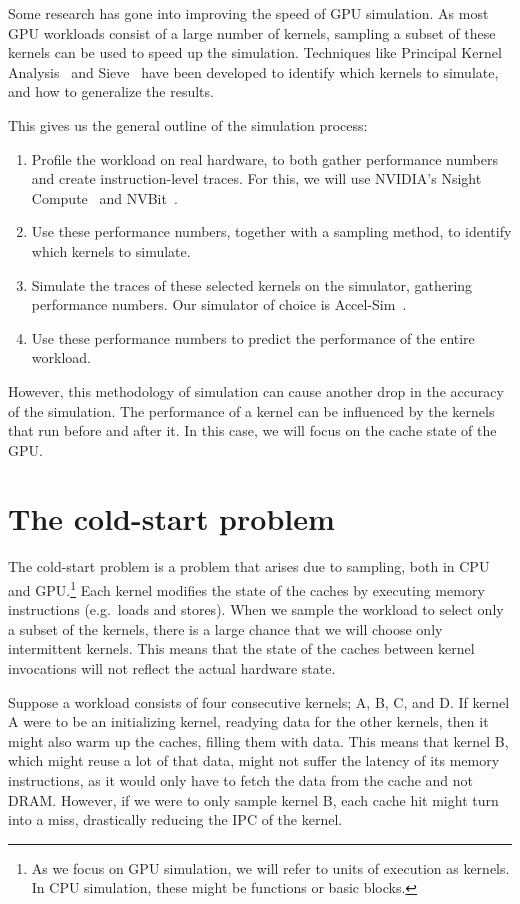 Some research has gone into improving the speed of GPU simulation.
As most GPU workloads consist of a large number of kernels, sampling a subset of these kernels can be used to speed up the simulation.
Techniques like Principal Kernel Analysis~\cite{pks} and Sieve~\cite{sieve} have been developed to identify which kernels to simulate, and how to generalize the results.

This gives us the general outline of the simulation process:
\begin{enumerate}
    \item Profile the workload on real hardware, to both gather performance numbers and create instruction-level traces.
    For this, we will use NVIDIA's Nsight Compute~\cite{nsight} and NVBit~\cite{nvbit}.
    \item Use these performance numbers, together with a sampling method, to identify which kernels to simulate.
    \item Simulate the traces of these selected kernels on the simulator, gathering performance numbers.
    Our simulator of choice is Accel-Sim~\cite{accelsim}.
    \item Use these performance numbers to predict the performance of the entire workload.
\end{enumerate}

However, this methodology of simulation can cause another drop in the accuracy of the simulation.
The performance of a kernel can be influenced by the kernels that run before and after it.
In this case, we will focus on the cache state of the GPU\@.

\section{The cold-start problem}\label{sec:the-cold-start-problem}
The cold-start problem is a problem that arises due to sampling, both in CPU and GPU\@.\footnote{As we focus on GPU simulation, we will refer to units of execution as kernels. In CPU simulation, these might be functions or basic blocks.}
Each kernel modifies the state of the caches by executing memory instructions (e.g.\ loads and stores).
When we sample the workload to select only a subset of the kernels, there is a large chance that we will choose only intermittent kernels.
This means that the state of the caches between kernel invocations will not reflect the actual hardware state.

Suppose a workload consists of four consecutive kernels; A, B, C, and D\@.
If kernel A were to be an initializing kernel, readying data for the other kernels, then it might also warm up the caches, filling them with data.
This means that kernel B, which might reuse a lot of that data, might not suffer the latency of its memory instructions, as it would only have to fetch the data from the cache and not DRAM\@.
However, if we were to only sample kernel B, each cache hit might turn into a miss, drastically reducing the IPC of the kernel.

